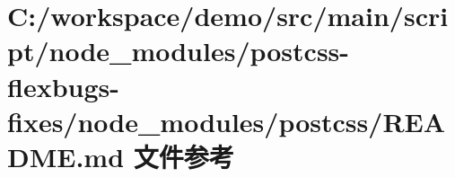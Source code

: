 \hypertarget{node__modules_2postcss-flexbugs-fixes_2node__modules_2postcss_2_r_e_a_d_m_e_8md}{}\section{C\+:/workspace/demo/src/main/script/node\+\_\+modules/postcss-\/flexbugs-\/fixes/node\+\_\+modules/postcss/\+R\+E\+A\+D\+ME.md 文件参考}
\label{node__modules_2postcss-flexbugs-fixes_2node__modules_2postcss_2_r_e_a_d_m_e_8md}
